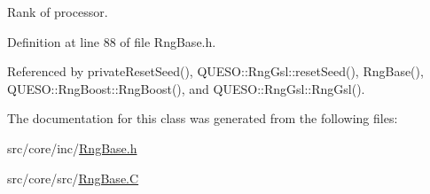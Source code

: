 Rank of processor. 



Definition at line 88 of file Rng\-Base.\-h.



Referenced by private\-Reset\-Seed(), Q\-U\-E\-S\-O\-::\-Rng\-Gsl\-::reset\-Seed(), Rng\-Base(), Q\-U\-E\-S\-O\-::\-Rng\-Boost\-::\-Rng\-Boost(), and Q\-U\-E\-S\-O\-::\-Rng\-Gsl\-::\-Rng\-Gsl().



The documentation for this class was generated from the following files\-:\begin{DoxyCompactItemize}
\item 
src/core/inc/\hyperlink{_rng_base_8h}{Rng\-Base.\-h}\item 
src/core/src/\hyperlink{_rng_base_8_c}{Rng\-Base.\-C}\end{DoxyCompactItemize}
